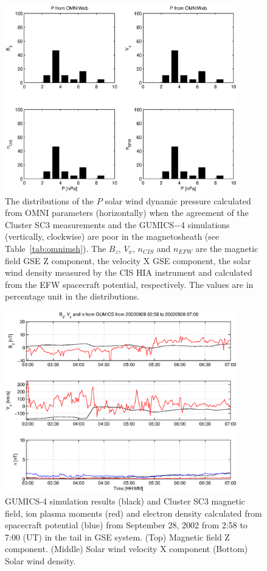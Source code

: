 \documentclass[linenumbers,draft]{agujournal}
\begin{document}
\begin{figure}[h]
\centering
\includegraphics[width=0.9\textwidth,angle=0]{swe-2020-corr-f19.eps}  
\caption{The distributions of the $P$ solar wind dynamic pressure calculated from OMNI parameters (horizontally) when the agreement of the Cluster SC3 measurements and the GUMICS$-$4 simulations (vertically, clockwise) are poor in the magnetosheath (see Table~\ref{tab:omnimsh}). The $B_{z}$, $V_{x}$, $n_{CIS}$ and $n_{EFW}$ are the magnetic field GSE Z component, the velocity X GSE component, the solar wind density measured by the CIS HIA instrument and calculated from the EFW spacecraft potential, respectively. The values are in percentage unit in the distributions.}
\label{fig:mshomnip}
\end{figure}

\pagebreak

\begin{figure}[h]
\centering
\includegraphics[width=0.9\textwidth,angle=0]{swe-2020-corr-f20.eps}  
\caption{GUMICS-4 simulation results (black) and Cluster SC3 magnetic field, ion plasma moments (red) and electron density calculated from spacecraft potential (blue) from September 28, 2002 from 2:58 to 7:00 (UT) in the tail in GSE system. (Top) Magnetic field Z component. (Middle) Solar wind velocity X component (Bottom) Solar wind density.}
\label{fig:nsplot}
\end{figure}
\end{document}
